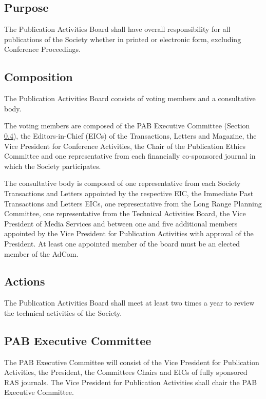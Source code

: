 \documentclass[10pt]{article}
\newcommand{\secref}[1]{Section \ref{#1}}
\begin{document}
\subsection{Purpose}
The Publication Activities Board shall have overall responsibility for all publications of the Society whether in printed or electronic form, excluding Conference Proceedings.  




\subsection{Composition}

The Publication Activities Board consists of voting members and a consultative body. 

The voting members are composed of the PAB Executive Committee (\secref{PAB:ExCom}), the Editors-in-Chief (EICs) of the Transactions, Letters and Magazine, the Vice President for Conference Activities, the Chair of the Publication Ethics Committee and one representative from each financially co-sponsored journal in which the Society participates. 

The consultative body is composed of one representative from each Society Transactions and Letters appointed by the respective EIC, the Immediate Past Transactions and Letters EICs, one representative from the Long Range Planning Committee, one representative from the Technical Activities Board, the Vice President of Media Services and between one and five additional  members appointed by the Vice President for Publication Activities with approval of the President. At least one appointed member of the board must be an elected member of the AdCom.


\subsection{Actions}

The Publication Activities Board shall meet at least two times a year to review the technical activities of the Society.

\subsection{PAB Executive Committee}
\label{PAB:ExCom}

The PAB Executive Committee will consist of the Vice President for Publication Activities, the President, the Committees Chairs and EICs of fully sponsored RAS journals. The Vice President for Publication Activities shall chair the PAB Executive Committee.
\end{document}

